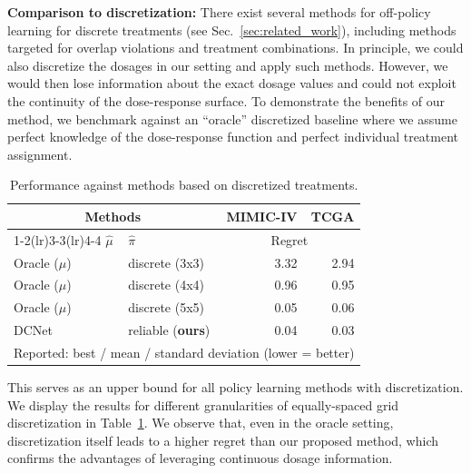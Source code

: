 \documentclass{article}
\theoremstyle{definition}
\theoremstyle{plain}
\begin{document}
\textbf{Comparison to discretization:} There exist several methods for off-policy learning for discrete treatments (see Sec.~\ref{sec:related_work}), including methods targeted for overlap violations and treatment combinations. In principle, we could also discretize the dosages in our setting and apply such methods. However, we would then lose information about the exact dosage values and could not exploit the continuity of the dose-response surface. To demonstrate the benefits of our method,  we benchmark against an ``oracle'' discretized baseline where we assume perfect knowledge of the dose-response function and perfect individual treatment assignment. 
\begin{table}
\vspace{-0.2cm}
\centering
\scriptsize
     \begin{tabular}{ll|r|r}
    \toprule
    
     \multicolumn{2}{c}{\textbf{Methods}} & {\textbf{MIMIC-IV}} & {\textbf{TCGA}} \\
     \cmidrule(lr){1-2}\cmidrule(lr){3-3}\cmidrule(lr){4-4}
      $\hat{\mu}$ &   $\hat{\pi}$ &  \multicolumn{2}{c}{Regret}  \\
      \midrule
    
   
   Oracle ($\mu$) & discrete (3x3) &   3.32 &   2.94  \\
     Oracle ($\mu$) & discrete (4x4) &   0.96 &   0.95  \\
      Oracle ($\mu$) & discrete (5x5) &   0.05 &   0.06 \\
      

   \midrule
    DCNet &        reliable (\textbf{ours}) &   0.04 &  0.03 \\

    \bottomrule
    \multicolumn{4}{l}{Reported: best / mean / standard deviation (lower = better)}
    \end{tabular}
        
        \vskip 0.2cm
        \caption{Performance against methods based on discretized treatments. }
        \label{tab:baselines_discrete}

\vspace{-0.4cm}
\end{table}This serves as an upper bound for all policy learning methods with discretization. We display the results for different granularities of equally-spaced grid discretization in Table~\ref{tab:baselines_discrete}. We observe that, even in the oracle setting, discretization itself leads to a higher regret than our proposed method, which confirms the advantages of leveraging continuous dosage information.
\end{document}
